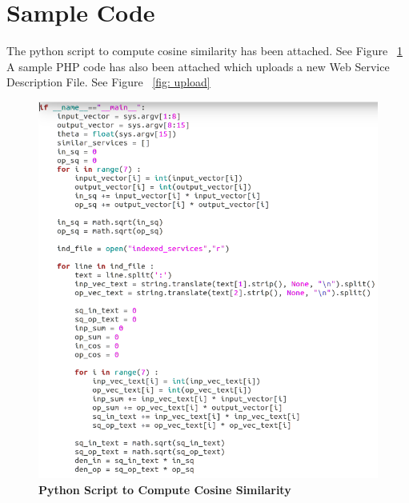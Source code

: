 \documentclass[12pt, twoside]{book}
\begin{document}
\section{Sample Code}
The python script to compute cosine similarity has been attached. See Figure ~\ref{fig: cosine} \\
A sample PHP code has also been attached which uploads a new Web Service Description File. See Figure ~\ref{fig: upload} \\
\begin{figure}[h]
 \centering
 \includegraphics[width=\textwidth]{pics/cosine.png}
 \caption{\textbf{Python Script to Compute Cosine Similarity}}
 \label{fig: cosine}
\end{figure}
\end{document}
